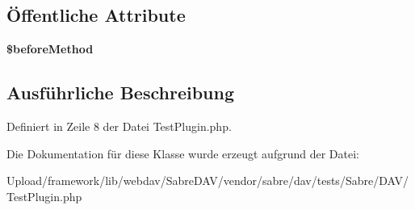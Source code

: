 \subsection*{Öffentliche Attribute}
\begin{DoxyCompactItemize}
\item 
\mbox{\label{class_sabre_1_1_d_a_v_1_1_test_plugin_a2938ee5c27a27e74d09ad1a596caaf71}} 
{\bfseries \$before\+Method}
\end{DoxyCompactItemize}


\subsection{Ausführliche Beschreibung}


Definiert in Zeile 8 der Datei Test\+Plugin.\+php.



Die Dokumentation für diese Klasse wurde erzeugt aufgrund der Datei\+:\begin{DoxyCompactItemize}
\item 
Upload/framework/lib/webdav/\+Sabre\+D\+A\+V/vendor/sabre/dav/tests/\+Sabre/\+D\+A\+V/Test\+Plugin.\+php\end{DoxyCompactItemize}
